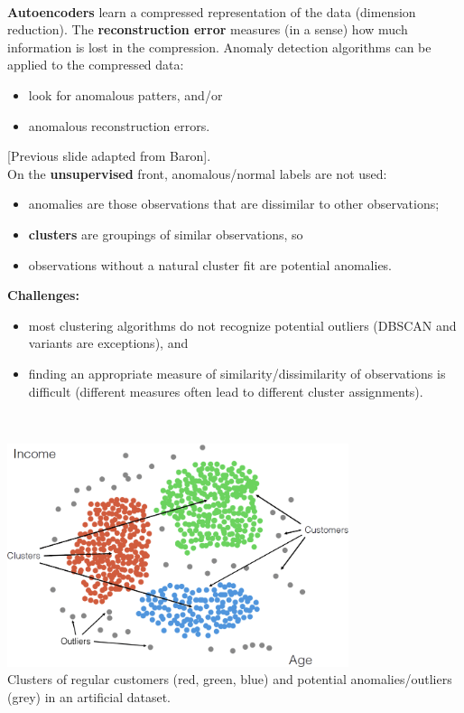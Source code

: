 \documentclass[20pt,landscape,footrule,headrule]{foils}
\newcommand{\newl}{\newline\newline}
\begin{document}
\newpage \ \\ \noindent
\noindent \textbf{Autoencoders} learn a compressed representation of the data (dimension reduction).
\newl The \textbf{reconstruction error} measures (in a sense) how much information is lost in the compression. 
\newl Anomaly detection algorithms can be applied to the compressed data:
\begin{itemize}
\item look for anomalous patters, and/or
\item anomalous reconstruction errors. 
\end{itemize}
[Previous slide adapted from Baron].
\newpage \ \\ \noindent On the \textbf{unsupervised} front,  anomalous/normal labels are not used:
\begin{itemize}
\item anomalies are those observations that are dissimilar to other observations;
\item \textbf{clusters} are groupings of similar observations, so 
\item observations without a natural cluster fit are potential anomalies. 
\end{itemize}
\textbf{Challenges:} 
\begin{itemize}
\item most clustering algorithms do not recognize potential outliers (DBSCAN and variants are exceptions), and 
\item finding an appropriate measure of similarity/dissimilarity of observations is difficult (different measures often lead to different cluster assignments).  \end{itemize}
\newpage\  
\begin{center}
\includegraphics[width=0.75\textwidth]{Images/clustering2_EN.png} \\ 
Clusters of regular customers (red, green, blue) and potential anomalies/outliers (grey) in an artificial dataset.
\end{center}
\end{document}

